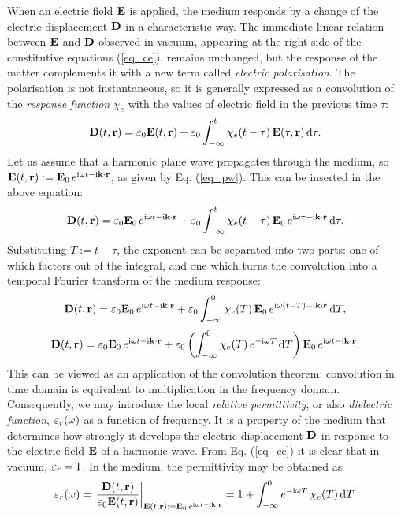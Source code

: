When an electric field $\mathbf{E}$ is applied, the medium responds by a change of the electric displacement $\mathbf{D}$ in a characteristic way. 
The immediate linear relation between $\mathbf{E}$ and $\mathbf{D}$ observed in vacuum, appearing at the right side of the constitutive equations (\ref{eq_ce}), remains unchanged, but the response of the matter complements it with a new term called \textit{electric polarisation}. The polarisation is not instantaneous, so it is generally expressed as a convolution of the \textit{response function} $\chi_e$ with the values of electric field in the previous time $\tau$:
\begin{equation} \mathbf{D}(t,{\mathbf{r}}) = \varepsilon_0 \mathbf{E}(t,{\mathbf{r}}) + \varepsilon_0 \int_{-\infty}^{t}\chi_e(t-\tau)\, \mathbf{E}(\tau,{\mathbf{r}})\,\mbox{d}\tau. \label{eq_loc_chi_convol}\end{equation}
Let us assume that a harmonic plane wave propagates through the medium, so $\mathbf{E}(t, {\mathbf{r}}) := \mathbf{E}_0 \, e^{{\mathrm i}\omega t - {\mathrm i}{\mathbf{k}}\cdot{\mathbf{r}}}$, as given by Eq. (\ref{eq_pw}). This can be inserted in the above equation:
\begin{equation} \mathbf{D}(t,{\mathbf{r}}) = \varepsilon_0 \mathbf{E}_0 \, e^{{\mathrm i}\omega t - {\mathrm i}{\mathbf{k}}\cdot{\mathbf{r}}} + \varepsilon_0 \int_{-\infty}^{t} \chi_e(t-\tau) \, \mathbf{E}_0 \, e^{{\mathrm i}\omega \tau - {\mathrm i}{\mathbf{k}}\cdot{\mathbf{r}}} \,\mbox{d}\tau. \label{eq_chi_convol_harm}\end{equation}
	Substituting $T:=t-\tau$, the exponent can be separated into two parts: one of which factors out of the integral, and one which turns the convolution into a temporal Fourier transform of the medium response:
$$				 \mathbf{D}(t,{\mathbf{r}}) = \varepsilon_0 \mathbf{E}_0 \, e^{{\mathrm i}\omega t - {\mathrm i}{\mathbf{k}}\cdot{\mathbf{r}}} + \varepsilon_0 \int_{-\infty}^{0} \chi_e(T) \, \mathbf{E}_0 \, e^{{\mathrm i}\omega (t - T) - {\mathrm i}{\mathbf{k}}\cdot{\mathbf{r}}} \,\mbox{d}T,$$
$$				 \mathbf{D}(t,{\mathbf{r}}) = \varepsilon_0 \mathbf{E}_0 \, e^{{\mathrm i}\omega t - {\mathrm i}{\mathbf{k}}\cdot{\mathbf{r}}} + \varepsilon_0 \left( \int_{-\infty}^{0} \chi_e(T)  \, e^{-{\mathrm i}\omega T}\,\mbox{d}T  \right) \mathbf{E}_0 \, e^{{\mathrm i}\omega t - {\mathrm i}{\mathbf{k}}\cdot{\mathbf{r}}}.$$
This can be viewed as an application of the convolution theorem: convolution in time domain is equivalent to multiplication in the frequency domain.  %
Consequently, we may introduce the local \textit{relative permittivity}, or also \textit{dielectric function}, $\varepsilon_r(\omega)$ as a function of frequency. It is a property of the medium that determines how strongly it develops the electric displacement $\mathbf{D}$ in response to the electric field $\mathbf{E}$ of a harmonic wave.
From Eq. (\ref{eq_ce}) it is clear that in vacuum,  $\varepsilon_r = 1$. In the medium, the permittivity may be obtained as %
\begin{equation}  \varepsilon_r(\omega) = \left.\frac{\mathbf{D}(t,{\mathbf{r}})}{\varepsilon_0 \mathbf{E}(t,{\mathbf{r}})} \right|_{\mathbf{E}(t, {\mathbf{r}}) := \mathbf{E}_0 \, e^{{\mathrm i}\omega t - {\mathrm i}{\mathbf{k}}\cdot{\mathbf{r}}}} = 1 + \int_{-\infty}^{0} e^{-{\mathrm i}\omega T} \,\chi_e(T) \,\mbox{d}T. \label{eq_eps_loc}\end{equation}

